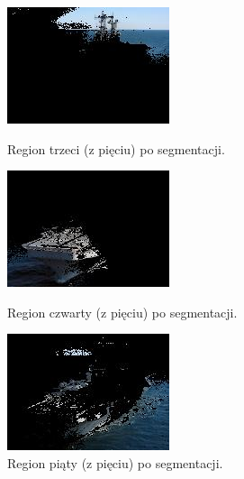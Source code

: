 \documentclass[10pt]{llncs}
\begin{document}
\begin{figure}[!htb]
  \includegraphics[width=\linewidth]{img/ship_k5_2.jpg}
  \caption{Region trzeci (z pięciu) po segmentacji.}\label{fig:19}
\endminipage\hfill
{}
  \includegraphics[width=\linewidth]{img/ship_k5_3.jpg}
  \caption{Region czwarty (z pięciu) po segmentacji.}\label{fig:20}
\endminipage\hfill
{}
  \includegraphics[width=\linewidth]{img/ship_k5_4.jpg}
  \caption{Region piąty (z pięciu) po segmentacji.}\label{fig:21}
\endminipage
\end{figure}

\FloatBarrier
\end{document}
